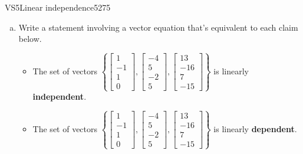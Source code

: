 \begin{exercise}{VS5}{Linear independence}{5275} 
\begin{exerciseStatement} 

\begin{enumerate}[(a)]
\item  

 Write a statement involving a vector equation that's equivalent to each claim below. 

 

\begin{itemize}
\item  

 The set of vectors \(\left\{ \left[\begin{array}{c}
1 \\
-1 \\
1 \\
0
\end{array}\right] , \left[\begin{array}{c}
-4 \\
5 \\
-2 \\
5
\end{array}\right] , \left[\begin{array}{c}
13 \\
-16 \\
7 \\
-15
\end{array}\right] \right\}\) is linearly \textbf{independent}. 

 
\item  

 The set of vectors \(\left\{ \left[\begin{array}{c}
1 \\
-1 \\
1 \\
0
\end{array}\right] , \left[\begin{array}{c}
-4 \\
5 \\
-2 \\
5
\end{array}\right] , \left[\begin{array}{c}
13 \\
-16 \\
7 \\
-15
\end{array}\right] \right\}\) is linearly \textbf{dependent}. 

 
\end{itemize}


\end{enumerate}
\end{exerciseStatement}
\end{exercise}
